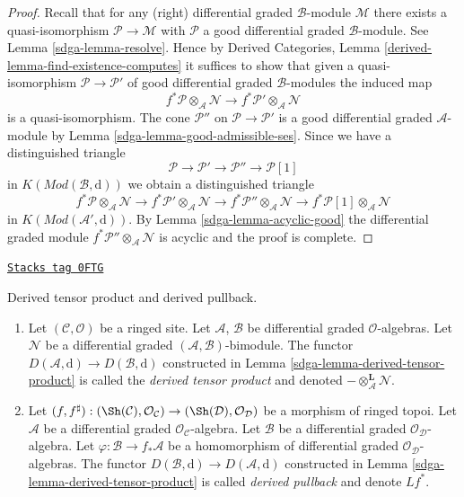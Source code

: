 \begin{proof}

Recall that for any (right) differential graded $\mathcal{B}$-module
$\mathcal{M}$ there exists a quasi-isomorphism $\mathcal{P} \to \mathcal{M}$
with $\mathcal{P}$ a good differential graded $\mathcal{B}$-module.
See Lemma \ref{sdga-lemma-resolve}.
Hence by Derived Categories, Lemma \ref{derived-lemma-find-existence-computes}
it suffices to show that given a quasi-isomorphism
$\mathcal{P} \to \mathcal{P}'$ of good differential graded
$\mathcal{B}$-modules the induced map
$$
f^*\mathcal{P} \otimes_\mathcal{A} \mathcal{N}
\longrightarrow
f^*\mathcal{P}' \otimes_\mathcal{A} \mathcal{N}
$$
is a quasi-isomorphism. The cone $\mathcal{P}''$ on
$\mathcal{P} \to \mathcal{P}'$ is a good differential graded
$\mathcal{A}$-module by Lemma \ref{sdga-lemma-good-admissible-ses}.
Since we have a distinguished triangle
$$
\mathcal{P} \to \mathcal{P}' \to \mathcal{P}'' \to \mathcal{P}[1]
$$
in $K(\textit{Mod}(\mathcal{B}, \text{d}))$ we obtain a distinguished
triangle
$$
f^*\mathcal{P} \otimes_\mathcal{A} \mathcal{N} \to
f^*\mathcal{P}' \otimes_\mathcal{A} \mathcal{N} \to
f^*\mathcal{P}'' \otimes_\mathcal{A} \mathcal{N} \to
f^*\mathcal{P}[1] \otimes_\mathcal{A} \mathcal{N}
$$
in $K(\textit{Mod}(\mathcal{A}', \text{d}))$. By
Lemma \ref{sdga-lemma-acyclic-good}
the differential graded module
$f^*\mathcal{P}'' \otimes_\mathcal{A} \mathcal{N}$
is acyclic and the proof is complete.
\end{proof}

\begin{definition}[Pullback]
\label{sdga-definition-pullback}
\href{https://stacks.math.columbia.edu/tag/0FTG}{\texttt{Stacks tag 0FTG}}

Derived tensor product and derived pullback.
\begin{enumerate}
\item Let $(\mathcal{C}, \mathcal{O})$ be a ringed site. Let
$\mathcal{A}$, $\mathcal{B}$ be differential graded $\mathcal{O}$-algebras.
Let $\mathcal{N}$ be a  differential graded
$(\mathcal{A}, \mathcal{B})$-bimodule.
The functor $D(\mathcal{A}, \text{d}) \to D(\mathcal{B}, \text{d})$
constructed in Lemma \ref{sdga-lemma-derived-tensor-product}
is called the {\it derived tensor product} and denoted
$- \otimes_\mathcal{A}^\mathbf{L} \mathcal{N}$.
\item Let $(f, f^\sharp) : (\Sh(\mathcal{C}), \mathcal{O}_\mathcal{C})
\to (\Sh(\mathcal{D}), \mathcal{O}_\mathcal{D})$
be a morphism of ringed topoi. Let $\mathcal{A}$ be a differential
graded $\mathcal{O}_\mathcal{C}$-algebra. Let $\mathcal{B}$ be a
differential graded $\mathcal{O}_\mathcal{D}$-algebra. Let
$\varphi : \mathcal{B} \to f_*\mathcal{A}$ be a homomorphism
of differential graded $\mathcal{O}_\mathcal{D}$-algebras.
The functor $D(\mathcal{B}, \text{d}) \to D(\mathcal{A}, \text{d})$
constructed in Lemma \ref{sdga-lemma-derived-tensor-product}
is called {\it derived pullback}
and denote $Lf^*$.
\end{enumerate}
\end{definition}

